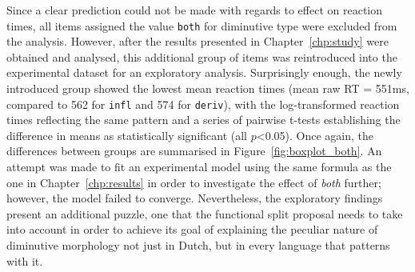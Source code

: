 Since a clear prediction could not be made with regards to effect on reaction times, all items assigned the value \texttt{both} for diminutive type were excluded from the analysis. However, after the results presented in Chapter~\ref{chp:study} were obtained and analysed, this additional group of items was reintroduced into the experimental dataset for an exploratory analysis. Surprisingly enough, the newly introduced group showed the lowest mean reaction times (mean raw RT = 551ms, compared to 562 for \texttt{infl} and 574 for \texttt{deriv}), with the log-transformed reaction times reflecting the same pattern and a series of pairwise t-tests establishing the difference in means as statistically significant (all $p$<0.05). Once again, the differences between groups are summarised in Figure~\ref{fig:boxplot_both}. An attempt was made to fit an experimental model using the same formula as the one in Chapter~\ref{chp:results} in order to investigate the effect of \textit{both} further; however, the model failed to converge. Nevertheless, the exploratory findings present an additional puzzle, one that the functional split proposal needs to take into account in order to achieve its goal of explaining the peculiar nature of diminutive morphology not just in Dutch, but in every language that patterns with it.

